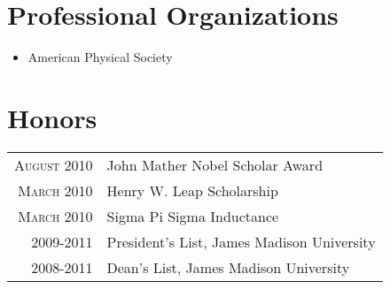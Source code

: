 \documentclass[a4paper,10pt]{article}
\begin{document}
\section{Professional Organizations}
\begin{itemize}

\item American Physical Society

\end{itemize}


\section{Honors}
\begin{tabular}{rl}
 \textsc{August} 2010 & John Mather Nobel Scholar Award \\
\textsc{March} 2010 & Henry W. Leap Scholarship \\
\textsc{March} 2010 & Sigma Pi Sigma Inductance \\
2009-2011 & President's List, James Madison University \\
2008-2011 & Dean's List, James Madison University \\
\end{tabular}



\end{document}
